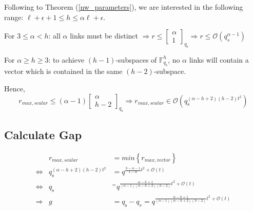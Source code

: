 Following to Theorem (\ref{nw_parameters}), we are interested in
the following range: $\ell+\epsilon+1\leq h\leq\alpha\ell+\epsilon$.

For $3\leq\alpha<h$: all $\alpha$ links must be distinct $\Rightarrow r\leq\left[\begin{array}{c}
\alpha\\
1
\end{array}\right]_{q_{\mathrm{s}}}\Rightarrow r\leq\mathcal{O}\left(q_{s}^{\alpha-1}\right)$

For $\alpha\geq h\geq3$: to achieve $(h-1)$-subspaces of $\ensuremath{\mathbb{F}}_{q_{\mathrm{s}}}^{h}$,
no $\alpha$ links will contain a vector which is contained in the
same $(h-2)$-subspace.

Hence,
\[
r_{max,scalar}\leq\left(\alpha-1\right)\left[\begin{array}{c}
\alpha\\
h-2
\end{array}\right]_{q_{\mathrm{s}}}\Rightarrow r_{max,scalar}\in\mathcal{O}\left(q_{\mathrm{s}}^{\left(\alpha-h+2\right)\left(h-2\right)t^{2}}\right)
\]


\subsection{Calculate Gap }

\begin{eqnarray*}
 & r_{max,scalar} & =min\left\{ r_{max,vector}\right\} \\
\Leftrightarrow & q_{\mathrm{s}}^{\left(\alpha-h+2\right)\left(h-2\right)t^{2}} & =q^{\frac{h-\alpha-1}{1-\alpha}t^{2}+\mathcal{O}(t)}\\
\Leftrightarrow & q_{\mathrm{s}} & ^{=}q^{\frac{\alpha-h+1}{\left(\alpha-1\right)\left(\alpha-h+2\right)\left(h-2\right)}t^{2}+\mathcal{O}(t)}\\
\Rightarrow & g & =q_{\mathrm{s}}-q_{v}=q^{\frac{\alpha-h+1}{\left(\alpha-1\right)\left(\alpha-h+2\right)\left(h-2\right)}t^{2}+\mathcal{O}(t)}
\end{eqnarray*}


